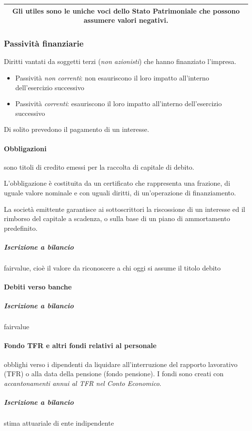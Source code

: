 \documentclass[10pt,a4paper,fleqn,oneside]{book}
\newcommand{\textbox}[1]{
\vspace{1em}
\begin{center}
    \begin{tabular}{|c|}
        \hline
        #1\\
        \hline
    \end{tabular}
\end{center}
}
\begin{document}
\textbox{Gli \glspl{utile} sono le uniche voci dello Stato Patrimoniale che 
possono assumere valori negativi.}

\subsubsection{Passività finanziarie}
Diritti vantati da soggetti terzi (\emph{non azionisti}) che hanno finanziato l’impresa.
\begin{itemize}
    \item Passività \emph{non correnti}: non esauriscono il loro impatto all’interno dell’\gls{esercizio} successivo
    \item Passività \emph{correnti}: esauriscono il loro impatto all’interno dell’\gls{esercizio} successivo 
\end{itemize}
Di solito prevedono il pagamento di un interesse.

\paragraph{Obbligazioni} sono titoli di credito emessi per la raccolta di capitale di debito.

L’obbligazione è costituita da un certificato che rappresenta una frazione, di uguale
valore nominale e con uguali diritti, di un’operazione di finanziamento.

La società emittente garantisce ai sottoscrittori la riscossione di un interesse
ed il rimborso del capitale a scadenza, o sulla base di un piano di ammortamento predefinito.

\subparagraph{Iscrizione a bilancio} \gls{fairvalue}, cioè il valore da riconoscere
a chi oggi si assume il titolo debito

\paragraph{Debiti verso banche}
\subparagraph{Iscrizione a bilancio} \gls{fairvalue}

\paragraph{Fondo TFR e altri fondi relativi al personale} obblighi verso i dipendenti
da liquidare all’interruzione del rapporto lavorativo (\gls{TFR}) o alla data della pensione
(fondo pensione). I fondi sono creati con \emph{accantonamenti annui al TFR nel Conto Economico}.
\subparagraph{Iscrizione a bilancio} stima attuariale di ente indipendente
\end{document}
